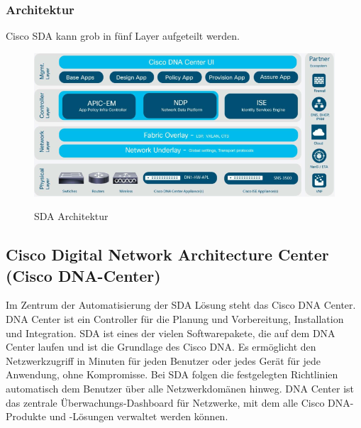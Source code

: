 \subsubsection{Architektur}
Cisco SDA kann grob in fünf Layer aufgeteilt werden.
\begin{figure}[H]
	\centering
	\includegraphics[width=1\linewidth]{img/cisco-sda-architecture.png}\\[1px]
	\caption{SDA Architektur}
	\label{fig:SDA Architektur}
\end{figure}


\subsection{Cisco Digital Network Architecture Center (Cisco DNA-Center)}
Im Zentrum der Automatisierung der SDA Lösung steht das Cisco DNA Center. DNA Center ist ein Controller für die Planung und Vorbereitung, Installation und Integration. SDA ist eines der vielen Softwarepakete, die auf dem DNA Center laufen und ist die Grundlage des Cisco DNA. Es ermöglicht den Netzwerkzugriff in Minuten für jeden Benutzer oder jedes Gerät für jede Anwendung, ohne Kompromisse. Bei SDA folgen die festgelegten Richtlinien automatisch dem Benutzer über alle Netzwerkdomänen hinweg.
DNA Center ist das zentrale Überwachungs-Dashboard für Netzwerke, mit dem alle Cisco DNA-Produkte und -Lösungen verwaltet werden können.

